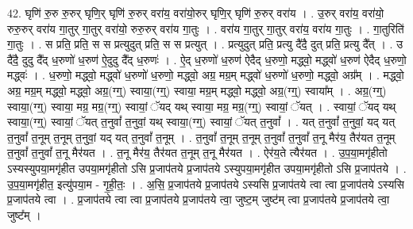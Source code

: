 \documentclass[17pt]{extarticle}
\begin{document}
42. घृणि॑ रु॒रु रु॒रुर् घृणि॒र् घृणि॑ रु॒रुर् वरा॑य॒ वरा॑यो॒रुर् घृणि॒र् घृणि॑ रु॒रुर् वरा॑य । . उ॒रुर् वरा॑य॒ वरा॑यो॒ रुरु॒रुर् वरा॑य गा॒तुर् गा॒तुर् वरा॑यो॒ रुरु॒रुर् वरा॑य गा॒तुः । . वरा॑य गा॒तुर् गा॒तुर् वरा॑य॒ वरा॑य गा॒तुः । . गा॒तुरिति॑ गा॒तुः । . स प्रति॒ प्रति॒ स स प्रत्युदुत् प्रति॒ स स प्रत्युत् । . प्रत्युदुत् प्रति॒ प्रत्यु दै॑दै॒ दुत् प्रति॒ प्रत्यु दै᳚त् । . उ दै॑दै॒ दुदु दै᳚द् ध॒रुणो॑ ध॒रुण॑ ऐ॒दुदु दै᳚द् ध॒रुणः॑ । . ऐ॒द् ध॒रुणो॑ ध॒रुण॑ ऐदैद् ध॒रुणो॒ मद्ध्वो॒ मद्ध्वो॑ ध॒रुण॑ ऐदैद् ध॒रुणो॒ मद्ध्वः॑ । . ध॒रुणो॒ मद्ध्वो॒ मद्ध्वो॑ ध॒रुणो॑ ध॒रुणो॒ मद्ध्वो॒ अग्र॒ मग्र॒म् मद्ध्वो॑ ध॒रुणो॑ ध॒रुणो॒ मद्ध्वो॒ अग्र᳚म् । . मद्ध्वो॒ अग्र॒ मग्र॒म् मद्ध्वो॒ मद्ध्वो॒ अग्र॒(ग्ग्॒) स्वाया॒(ग्ग्॒) स्वाया॒ मग्र॒म् मद्ध्वो॒ मद्ध्वो॒ अग्र॒(ग्ग्॒) स्वाया᳚म् । . अग्र॒(ग्ग्॒) स्वाया॒(ग्ग्॒) स्वाया॒ मग्र॒ मग्र॒(ग्ग्॒) स्वायां॒ ॅयद् यथ् स्वाया॒ मग्र॒ मग्र॒(ग्ग्॒) स्वायां॒ ॅयत् । . स्वायां॒ ॅयद् यथ् स्वाया॒(ग्ग्॒) स्वायां॒ ॅयत् त॒नुवां᳚ त॒नुवां॒ यथ् स्वाया॒(ग्ग्॒) स्वायां॒ ॅयत् त॒नुवां᳚ । . यत् त॒नुवां᳚ त॒नुवां॒ यद् यत् त॒नुवां᳚ त॒नूम् त॒नूम् त॒नुवां॒ यद् यत् त॒नुवां᳚ त॒नूम् । . त॒नुवां᳚ त॒नूम् त॒नूम् त॒नुवां᳚ त॒नुवां᳚ त॒नू मैर॑य॒ तैर॑यत त॒नूम् त॒नुवां᳚ त॒नुवां᳚ त॒नू मैर॑यत । . त॒नू मैर॑य॒ तैर॑यत त॒नूम् त॒नू मैर॑यत । . ऐर॑य॒ते त्यैर॑यत । . उ॒प॒या॒मगृ॑हीतो ऽस्यस्युपया॒मगृ॑हीत उपया॒मगृ॑हीतो ऽसि प्र॒जाप॑तये प्र॒जाप॑तये ऽस्युपया॒मगृ॑हीत उपया॒मगृ॑हीतो ऽसि प्र॒जाप॑तये । . उ॒प॒या॒मगृ॑हीत॒ इत्यु॑पया॒म - गृ॒ही॒तः॒ । . अ॒सि॒ प्र॒जाप॑तये प्र॒जाप॑तये ऽस्यसि प्र॒जाप॑तये त्वा त्वा प्र॒जाप॑तये ऽस्यसि प्र॒जाप॑तये त्वा । . प्र॒जाप॑तये त्वा त्वा प्र॒जाप॑तये प्र॒जाप॑तये त्वा॒ जुष्ट॒म् जुष्ट॑म् त्वा प्र॒जाप॑तये प्र॒जाप॑तये त्वा॒ जुष्ट᳚म् । \newline
\end{document}
